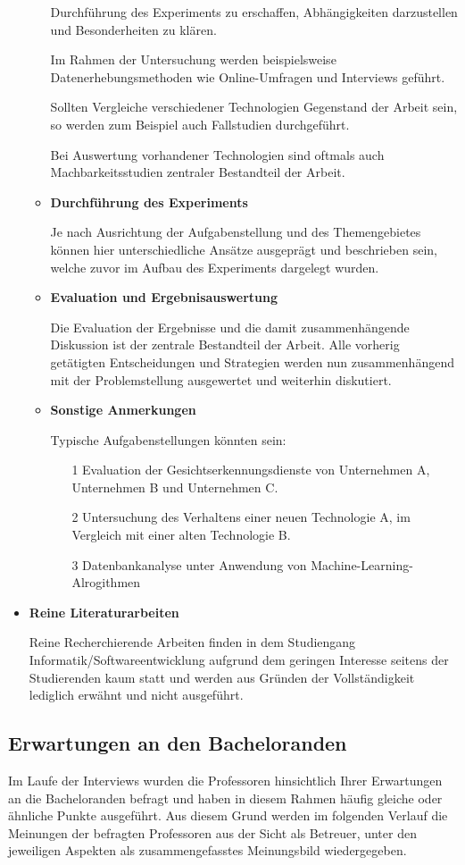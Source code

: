 \documentclass{scrreprt}
\begin{document}
\begin{itemize}
\begin{itemize}
	Durchführung des Experiments zu erschaffen, Abhängigkeiten darzustellen und Besonderheiten 
	zu klären. 
	\par Im Rahmen der Untersuchung werden beispielsweise Datenerhebungsmethoden wie 
	Online-Umfragen und Interviews geführt. 
	\par Sollten Vergleiche verschiedener Technologien 
	Gegenstand der Arbeit sein, so werden zum Beispiel auch Fallstudien durchgeführt. 
	\par Bei Auswertung vorhandener Technologien sind oftmals auch Machbarkeitsstudien zentraler 
	Bestandteil der Arbeit.
	\item \textbf{Durchführung des Experiments}
	\par Je nach Ausrichtung der Aufgabenstellung und des Themengebietes können hier 
	unterschiedliche Ansätze ausgeprägt und beschrieben sein, welche zuvor im Aufbau des 
	Experiments dargelegt wurden. 
	\item \textbf{Evaluation und Ergebnisauswertung}
	\par Die Evaluation der Ergebnisse und die damit zusammenhängende Diskussion ist der 
	zentrale Bestandteil der Arbeit. Alle vorherig getätigten Entscheidungen und Strategien 
	werden nun zusammenhängend mit der Problemstellung ausgewertet und weiterhin diskutiert. 
	\item \textbf{Sonstige Anmerkungen}
	\par Typische Aufgabenstellungen könnten sein:
	\begin{itemize}
		\item[1] Evaluation der Gesichtserkennungsdienste von Unternehmen A, Unternehmen B und 
		Unternehmen C.
		\item[2] Untersuchung des Verhaltens einer neuen Technologie A, im Vergleich mit einer 
		alten Technologie B.
		\item[3] Datenbankanalyse unter Anwendung von Machine-Learning-Alrogithmen
	\end{itemize}
	\end{itemize}
\item \textbf{Reine Literaturarbeiten}
\par Reine Recherchierende Arbeiten finden in dem Studiengang Informatik/Softwareentwicklung aufgrund dem geringen Interesse seitens der Studierenden kaum statt und werden aus Gründen der Vollständigkeit lediglich erwähnt und nicht ausgeführt.
\end{itemize}

\subsection{Erwartungen an den Bacheloranden}
\par Im Laufe der Interviews wurden die Professoren hinsichtlich Ihrer Erwartungen an die Bacheloranden befragt und haben in diesem Rahmen häufig gleiche oder ähnliche Punkte ausgeführt. Aus diesem Grund werden im folgenden Verlauf die Meinungen der befragten Professoren aus der Sicht als Betreuer, unter den jeweiligen Aspekten als zusammengefasstes Meinungsbild wiedergegeben.
\end{document}
